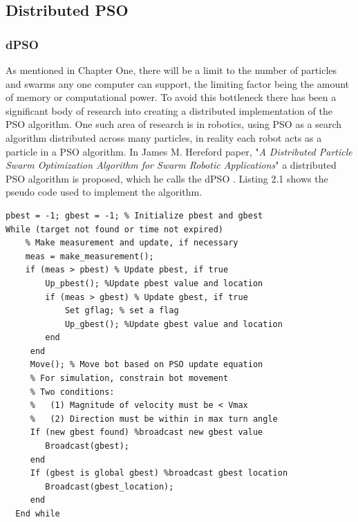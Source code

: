 \documentclass[oneside,12pt]{book}
\begin{document}
\subsection{Distributed PSO}
\subsubsection{dPSO}
As mentioned in Chapter One, there will be a limit to the number of particles and swarms any one computer can support, the limiting factor being the amount of memory or computational power. To avoid this bottleneck there has been a significant body of research into creating a distributed implementation of the PSO algorithm.  One such area of research is in robotics, using PSO as a search algorithm distributed across many particles, in reality each robot acts as a particle in a PSO algorithm. In James M. Hereford paper, "\textit{A Distributed Particle Swarm Optimization Algorithm for Swarm Robotic Applications}" a distributed PSO algorithm is proposed, which he calls the dPSO \cite{hereford_2006}. Listing 2.1 shows the pseudo code used to implement the algorithm. 

\begin{lstlisting}[language=inform, caption=Herefords dPSO Code Flow]
pbest = -1; gbest = -1; % Initialize pbest and gbest 
While (target not found or time not expired) 
	% Make measurement and update, if necessary 
    meas = make_measurement();  
    if (meas > pbest) % Update pbest, if true
    	Up_pbest(); %Update pbest value and location
        if (meas > gbest) % Update gbest, if true
        	Set gflag; % set a flag 
            Up_gbest(); %Update gbest value and location
        end 
     end 
     Move(); % Move bot based on PSO update equation  
     % For simulation, constrain bot movement 
     % Two conditions: 
     %   (1) Magnitude of velocity must be < Vmax 
     %   (2) Direction must be within in max turn angle
     If (new gbest found) %broadcast new gbest value       
     	Broadcast(gbest);  
     end
     If (gbest is global gbest) %broadcast gbest location      
     	Broadcast(gbest_location);  
     end
  End while
\end{lstlisting}
\end{document}
